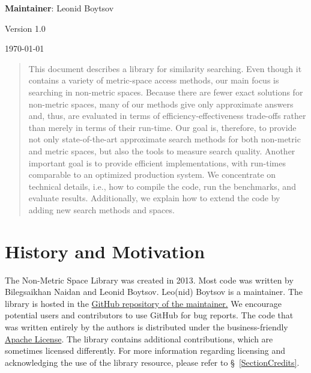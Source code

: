 \documentclass[runningheads,a4paper]{llncs}
\begin{document}
{\begin{center}{\small \textbf{Maintainer}: Leonid Boytsov}\end{center}}
{\begin{center}{Version 1.0}\end{center} 
{\begin{center}{{\today}}\end{center}}

\begin{abstract}
This document describes a library for similarity searching.
Even though it contains a variety of metric-space access methods,
our main focus is searching in non-metric spaces.
Because there are fewer exact solutions for non-metric spaces,
many of our methods give only approximate answers and, thus,
are evaluated in terms of efficiency-effectiveness trade-offs
rather than merely in terms of their run-time.
Our goal is, therefore, to provide
not only state-of-the-art approximate search methods for 
both non-metric and metric spaces,
but also the tools to measure search quality.
Another important goal is to provide efficient implementations,
with run-times comparable to an optimized production system. 
We concentrate on technical details, i.e., 
how to compile the code, run the benchmarks, and evaluate results.
Additionally, we explain how to extend the code by adding
new search methods and spaces.
\end{abstract}

\section{History and Motivation}
The Non-Metric Space Library was created in 2013.
Most code was written by Bilegsaikhan Naidan and Leonid Boytsov.
Leo(nid) Boytsov is a maintainer.
The library is hosted in the \href{https://github.com/searchivarius/NonMetricSpaceLib}{GitHub repository of  the maintainer.} 
We encourage potential users and contributors to use GitHub for bug reports.
The code that was written entirely by the authors is distributed under the business-friendly \href{http://apache.org/licenses/LICENSE-2.0}{Apache License}. 
The library contains additional contributions, which are sometimes licensed differently.
For more information regarding licensing and acknowledging the use of the library
resource, please refer to \S~\ref{SectionCredits}.

}
\end{document}
